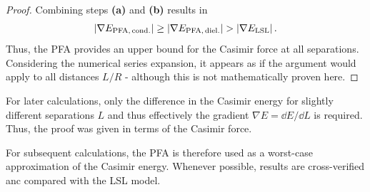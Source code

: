 \begin{proof}
  Combining steps \textbf{(a)} and \textbf{(b)} results in
  \begin{equation}
    \left\lvert\nabla E_\mathrm{PFA,\,cond.}\right\rvert \geq \left\lvert\nabla E_\mathrm{PFA,\,diel.}\right\rvert > \left\lvert\nabla E_\mathrm{LSL}\right\rvert .
  \end{equation}
  Thus, the PFA provides an upper bound for the Casimir force at all separations.
  Considering the numerical series expansion, it appears as if the argument would apply to all distances $L/R$ - although this is not mathematically proven here.
\end{proof}
\begin{remark}
  For later calculations, only the difference in the Casimir energy for slightly different separations $L$ and thus effectively the gradient $\nabla E = \dd E / \dd L$ is required. Thus, the proof was given in terms of the Casimir force.
\end{remark}

For subsequent calculations, the PFA is therefore used as a worst-case approximation of the Casimir energy. Whenever possible, results are cross-verified anc compared with the LSL model.